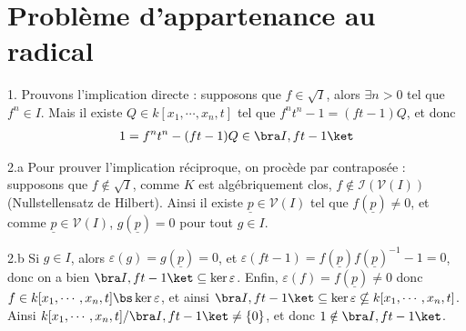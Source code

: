 \documentclass[11pt]{article}
\begin{document}
\section{Problème d'appartenance au radical}
    \begin{question}{1.}
        Prouvons l'implication directe : supposons que $f \in \sqrt{I}$, alors $\exists n > 0$ tel que $f^n \in I$. Mais il existe $Q \in k[x_1, \cdots, x_n, t]$ tel que $f^nt^n - 1 = (ft - 1)Q$, et donc 
        \begin{align*}
            1 = f^nt^n - (ft - 1)Q \in \bra I, ft - 1 \ket
        \end{align*}
    \end{question}
    \begin{question}{2.a}
        Pour prouver l'implication réciproque, on procède par contraposée : supposons que $f \notin \sqrt{I}$, comme $K$ est algébriquement clos, $f \notin \mathcal{I}(\mathcal{V}(I))$ (Nullstellensatz de Hilbert). Ainsi il existe $\underline{p} \in \mathcal{V}(I)$ tel que $f(\underline{p}) \neq 0$, et comme $\underline{p} \in \mathcal{V}(I)$, $g(\underline{p}) = 0$ pour tout $g \in I$.
    \end{question}
    \begin{question}{2.b}
        Si $g \in I$, alors $\varepsilon(g) = g(\underline{p}) = 0$, et $\varepsilon(ft - 1) = f(\underline{p})f(\underline{p})^{-1} - 1 = 0$, donc on a bien $\bra I, ft - 1 \ket \subseteq \ker \varepsilon$. Enfin, $\varepsilon(f) = f(\underline{p}) \neq 0$ donc $f \in k[x_1, \cdots, x_n, t] \bs \ker \varepsilon$, et ainsi $\bra I, ft - 1 \ket \subseteq \ker \varepsilon \nsubseteq k[x_1, \cdots, x_n, t]$. Ainsi $k[x_1, \cdots, x_n, t]/\bra I, ft - 1 \ket \neq \{0\}$, et donc $1 \notin \bra I, ft - 1 \ket$. 
    \end{question}
\end{document}
